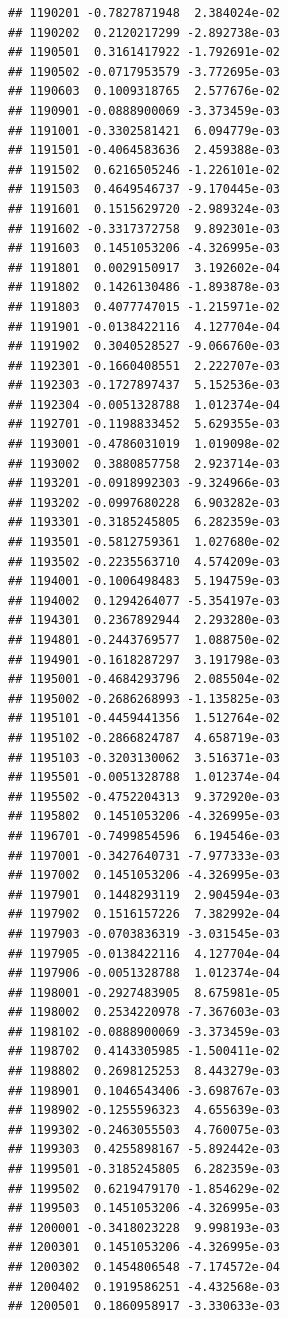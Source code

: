 \begin{frame}[fragile]
\begin{verbatim}
## 1190201 -0.7827871948  2.384024e-02
## 1190202  0.2120217299 -2.892738e-03
## 1190501  0.3161417922 -1.792691e-02
## 1190502 -0.0717953579 -3.772695e-03
## 1190603  0.1009318765  2.577676e-02
## 1190901 -0.0888900069 -3.373459e-03
## 1191001 -0.3302581421  6.094779e-03
## 1191501 -0.4064583636  2.459388e-03
## 1191502  0.6216505246 -1.226101e-02
## 1191503  0.4649546737 -9.170445e-03
## 1191601  0.1515629720 -2.989324e-03
## 1191602 -0.3317372758  9.892301e-03
## 1191603  0.1451053206 -4.326995e-03
## 1191801  0.0029150917  3.192602e-04
## 1191802  0.1426130486 -1.893878e-03
## 1191803  0.4077747015 -1.215971e-02
## 1191901 -0.0138422116  4.127704e-04
## 1191902  0.3040528527 -9.066760e-03
## 1192301 -0.1660408551  2.222707e-03
## 1192303 -0.1727897437  5.152536e-03
## 1192304 -0.0051328788  1.012374e-04
## 1192701 -0.1198833452  5.629355e-03
## 1193001 -0.4786031019  1.019098e-02
## 1193002  0.3880857758  2.923714e-03
## 1193201 -0.0918992303 -9.324966e-03
## 1193202 -0.0997680228  6.903282e-03
## 1193301 -0.3185245805  6.282359e-03
## 1193501 -0.5812759361  1.027680e-02
## 1193502 -0.2235563710  4.574209e-03
## 1194001 -0.1006498483  5.194759e-03
## 1194002  0.1294264077 -5.354197e-03
## 1194301  0.2367892944  2.293280e-03
## 1194801 -0.2443769577  1.088750e-02
## 1194901 -0.1618287297  3.191798e-03
## 1195001 -0.4684293796  2.085504e-02
## 1195002 -0.2686268993 -1.135825e-03
## 1195101 -0.4459441356  1.512764e-02
## 1195102 -0.2866824787  4.658719e-03
## 1195103 -0.3203130062  3.516371e-03
## 1195501 -0.0051328788  1.012374e-04
## 1195502 -0.4752204313  9.372920e-03
## 1195802  0.1451053206 -4.326995e-03
## 1196701 -0.7499854596  6.194546e-03
## 1197001 -0.3427640731 -7.977333e-03
## 1197002  0.1451053206 -4.326995e-03
## 1197901  0.1448293119  2.904594e-03
## 1197902  0.1516157226  7.382992e-04
## 1197903 -0.0703836319 -3.031545e-03
## 1197905 -0.0138422116  4.127704e-04
## 1197906 -0.0051328788  1.012374e-04
## 1198001 -0.2927483905  8.675981e-05
## 1198002  0.2534220978 -7.367603e-03
## 1198102 -0.0888900069 -3.373459e-03
## 1198702  0.4143305985 -1.500411e-02
## 1198802  0.2698125253  8.443279e-03
## 1198901  0.1046543406 -3.698767e-03
## 1198902 -0.1255596323  4.655639e-03
## 1199302 -0.2463055503  4.760075e-03
## 1199303  0.4255898167 -5.892442e-03
## 1199501 -0.3185245805  6.282359e-03
## 1199502  0.6219479170 -1.854629e-02
## 1199503  0.1451053206 -4.326995e-03
## 1200001 -0.3418023228  9.998193e-03
## 1200301  0.1451053206 -4.326995e-03
## 1200302  0.1454806548 -7.174572e-04
## 1200402  0.1919586251 -4.432568e-03
## 1200501  0.1860958917 -3.330633e-03

\end{verbatim}
\end{frame}
